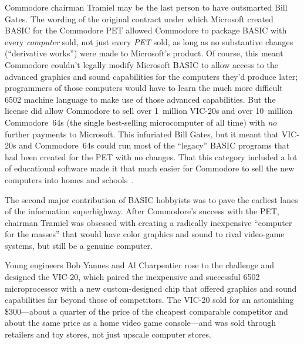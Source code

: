 \begin{tangent}

Commodore chairman Tramiel may be the last person to
have outsmarted Bill Gates.
The wording of the original contract under which Microsoft created
BASIC for the Commodore PET allowed Commodore to package BASIC with
every \emph{computer} sold, not just every \emph{PET} sold, as long as
no substantive changes (``derivative works'') were made to Microsoft's
product.
Of course, this meant Commodore couldn't legally modify Microsoft
BASIC to allow access to the advanced graphics and sound capabilities
for the computers they'd produce later; programmers of those computers
would have to learn the much more difficult 6502 machine language to
make use of those advanced capabilities.
But the license did allow Commodore to sell over 1~million VIC-20s and
over 10~million Commodore~64s (the single best-selling microcomputer
of all time) with \emph{no}\/ further payments to Microsoft.
This infuriated Bill Gates, but it meant that VIC-20s and
Commodore~64s could run most of the ``legacy'' BASIC programs that had
been created for the PET with no changes.
That this category included a lot of educational software made it that
much easier for Commodore to sell the new computers into homes and
schools~\cite[p. 414]{commodore}.

\end{tangent}

The second major contribution of BASIC hobbyists was to pave the
earliest lanes of the information superhighway.
After Commodore's success with the PET, chairman Tramiel was obsessed
with creating a radically inexpensive ``computer for the masses'' that
would have color graphics and sound to rival video-game systems, but
still be a genuine computer.

Young engineers Bob Yannes and Al Charpentier rose to the challenge
and designed the VIC-20, which paired the inexpensive and successful 6502
microprocessor with a new custom-designed chip that offered graphics and sound
capabilities far beyond those of competitors.
The VIC-20 sold for an astonishing \$300---about a quarter of the
price of the cheapest comparable competitor
and about the same price as a home video game console---and was sold
through retailers and toy stores, not just upscale computer stores.

